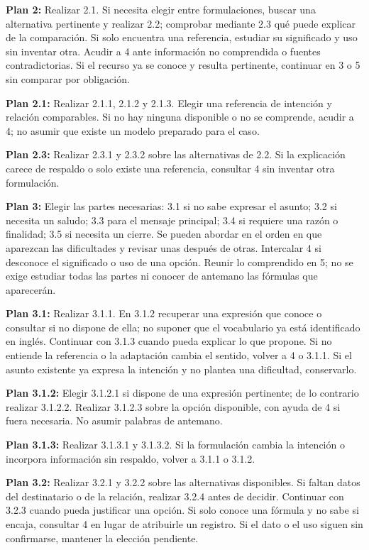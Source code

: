 \documentclass[10pt,a4paper]{article}
\begin{document}
\textbf{Plan 2:} Realizar 2.1. Si necesita elegir entre formulaciones, buscar una alternativa pertinente y realizar 2.2; comprobar mediante 2.3 qué puede explicar de la comparación. Si solo encuentra una referencia, estudiar su significado y uso sin inventar otra. Acudir a 4 ante información no comprendida o fuentes contradictorias. Si el recurso ya se conoce y resulta pertinente, continuar en 3 o 5 sin comparar por obligación.\par
\textbf{Plan 2.1:} Realizar 2.1.1, 2.1.2 y 2.1.3. Elegir una referencia de intención y relación comparables. Si no hay ninguna disponible o no se comprende, acudir a 4; no asumir que existe un modelo preparado para el caso.\par
\textbf{Plan 2.3:} Realizar 2.3.1 y 2.3.2 sobre las alternativas de 2.2. Si la explicación carece de respaldo o solo existe una referencia, consultar 4 sin inventar otra formulación.\par
\textbf{Plan 3:} Elegir las partes necesarias: 3.1 si no sabe expresar el asunto; 3.2 si necesita un saludo; 3.3 para el mensaje principal; 3.4 si requiere una razón o finalidad; 3.5 si necesita un cierre. Se pueden abordar en el orden en que aparezcan las dificultades y revisar unas después de otras. Intercalar 4 si desconoce el significado o uso de una opción. Reunir lo comprendido en 5; no se exige estudiar todas las partes ni conocer de antemano las fórmulas que aparecerán.\par
\textbf{Plan 3.1:} Realizar 3.1.1. En 3.1.2 recuperar una expresión que conoce o consultar si no dispone de ella; no suponer que el vocabulario ya está identificado en inglés. Continuar con 3.1.3 cuando pueda explicar lo que propone. Si no entiende la referencia o la adaptación cambia el sentido, volver a 4 o 3.1.1. Si el asunto existente ya expresa la intención y no plantea una dificultad, conservarlo.\par
\textbf{Plan 3.1.2:} Elegir 3.1.2.1 si dispone de una expresión pertinente; de lo contrario realizar 3.1.2.2. Realizar 3.1.2.3 sobre la opción disponible, con ayuda de 4 si fuera necesaria. No asumir palabras de antemano.\par
\textbf{Plan 3.1.3:} Realizar 3.1.3.1 y 3.1.3.2. Si la formulación cambia la intención o incorpora información sin respaldo, volver a 3.1.1 o 3.1.2.\par
\textbf{Plan 3.2:} Realizar 3.2.1 y 3.2.2 sobre las alternativas disponibles. Si faltan datos del destinatario o de la relación, realizar 3.2.4 antes de decidir. Continuar con 3.2.3 cuando pueda justificar una opción. Si solo conoce una fórmula y no sabe si encaja, consultar 4 en lugar de atribuirle un registro. Si el dato o el uso siguen sin confirmarse, mantener la elección pendiente.\par
\end{document}
